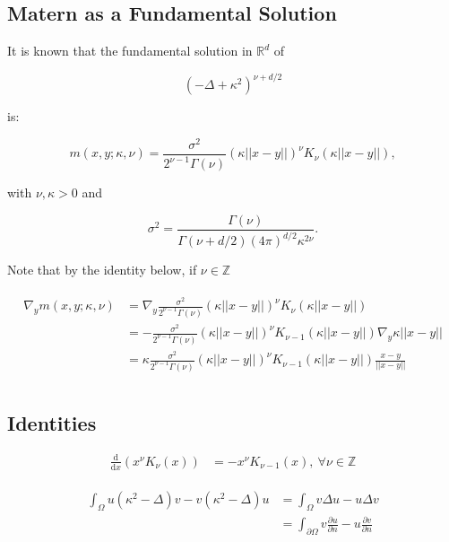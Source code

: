 \documentclass[paper=a4, fontsize=11pt]{scrartcl} %
\numberwithin{equation}{section} %
\numberwithin{figure}{section} %
\numberwithin{table}{section} %
\begin{document}
\subsection{Matern as a Fundamental Solution}
It is known \cite{lindgren2011explicit} that the fundamental solution in $\mathbb{R}^d$ of

$$
(-\Delta + \kappa^2)^{ \nu + d/2 }
$$

is:

$$
m(x,y; \kappa, \nu ) = \frac{\sigma^2}{2^{\nu-1}\Gamma(\nu)} (\kappa||x-y||)^{\nu} K_{\nu}( \kappa||x-y||), 
$$

with $\nu, \kappa > 0$ and

$$
\sigma^2 = \frac{\Gamma(\nu)}{\Gamma(\nu + d/2) (4\pi)^{d/2} \kappa^{2\nu}}.
$$

Note that by the identity below, if $\nu \in \mathbb{Z}$

\begin{align}\label{grad_matern}
  \begin{split}
  \nabla_{y} m( x,y; \kappa, \nu ) &= \nabla_{y} \frac{\sigma^2}{2^{\nu-1}\Gamma(\nu)} (\kappa||x-y||)^{\nu}K_{\nu}(\kappa||x-y||) \\
  &= -\frac{\sigma^2}{2^{\nu-1}\Gamma(\nu)} (\kappa||x-y||)^{\nu}K_{\nu-1}(\kappa||x-y||) \nabla_{y} \kappa||x-y|| \\
  &= \kappa\frac{\sigma^2}{2^{\nu-1}\Gamma(\nu)} (\kappa||x-y||)^{\nu}K_{\nu-1}(\kappa||x-y||) \frac{x-y}{||x-y||} \\
  \end{split}
\end{align}

\subsection{Identities}

\begin{align}\label{diff}
  \frac{\text{d}}{\text{d}x} (x^{\nu} K_{\nu}(x)) &= -x^{\nu}K_{\nu-1}(x), \ \forall \nu \in \mathbb{Z}
\end{align}




\begin{align*}
  \begin{split}
    \int_{\Omega} u( \kappa^2 - \Delta) v - v( \kappa^2 - \Delta) u &= \int_{\Omega} v\Delta u - u\Delta v\\
    &= \int_{\partial \Omega } v\frac{\partial u}{\partial n} - u \frac{\partial v}{\partial n}\\
\end{split}
\end{align*}
\end{document}

